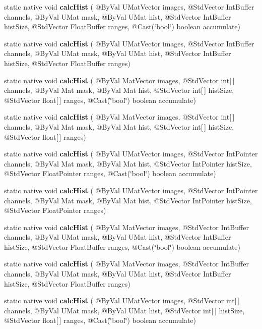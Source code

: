 \begin{DoxyCompactItemize}
\item 
static native void {\bfseries calc\+Hist} ( @By\+Val U\+Mat\+Vector images, @Std\+Vector Int\+Buffer channels, @By\+Val U\+Mat mask, @By\+Val U\+Mat hist, @Std\+Vector Int\+Buffer hist\+Size, @Std\+Vector Float\+Buffer ranges, @Cast(\char`\"{}bool\char`\"{}) boolean accumulate)
\item 
static native void {\bfseries calc\+Hist} ( @By\+Val U\+Mat\+Vector images, @Std\+Vector Int\+Buffer channels, @By\+Val U\+Mat mask, @By\+Val U\+Mat hist, @Std\+Vector Int\+Buffer hist\+Size, @Std\+Vector Float\+Buffer ranges)
\item 
static native void {\bfseries calc\+Hist} ( @By\+Val Mat\+Vector images, @Std\+Vector int\mbox{[}$\,$\mbox{]} channels, @By\+Val Mat mask, @By\+Val Mat hist, @Std\+Vector int\mbox{[}$\,$\mbox{]} hist\+Size, @Std\+Vector float\mbox{[}$\,$\mbox{]} ranges, @Cast(\char`\"{}bool\char`\"{}) boolean accumulate)
\item 
static native void {\bfseries calc\+Hist} ( @By\+Val Mat\+Vector images, @Std\+Vector int\mbox{[}$\,$\mbox{]} channels, @By\+Val Mat mask, @By\+Val Mat hist, @Std\+Vector int\mbox{[}$\,$\mbox{]} hist\+Size, @Std\+Vector float\mbox{[}$\,$\mbox{]} ranges)
\item 
static native void {\bfseries calc\+Hist} ( @By\+Val U\+Mat\+Vector images, @Std\+Vector Int\+Pointer channels, @By\+Val Mat mask, @By\+Val Mat hist, @Std\+Vector Int\+Pointer hist\+Size, @Std\+Vector Float\+Pointer ranges, @Cast(\char`\"{}bool\char`\"{}) boolean accumulate)
\item 
static native void {\bfseries calc\+Hist} ( @By\+Val U\+Mat\+Vector images, @Std\+Vector Int\+Pointer channels, @By\+Val Mat mask, @By\+Val Mat hist, @Std\+Vector Int\+Pointer hist\+Size, @Std\+Vector Float\+Pointer ranges)
\item 
static native void {\bfseries calc\+Hist} ( @By\+Val Mat\+Vector images, @Std\+Vector Int\+Buffer channels, @By\+Val U\+Mat mask, @By\+Val U\+Mat hist, @Std\+Vector Int\+Buffer hist\+Size, @Std\+Vector Float\+Buffer ranges, @Cast(\char`\"{}bool\char`\"{}) boolean accumulate)
\item 
static native void {\bfseries calc\+Hist} ( @By\+Val Mat\+Vector images, @Std\+Vector Int\+Buffer channels, @By\+Val U\+Mat mask, @By\+Val U\+Mat hist, @Std\+Vector Int\+Buffer hist\+Size, @Std\+Vector Float\+Buffer ranges)
\item 
static native void {\bfseries calc\+Hist} ( @By\+Val U\+Mat\+Vector images, @Std\+Vector int\mbox{[}$\,$\mbox{]} channels, @By\+Val U\+Mat mask, @By\+Val U\+Mat hist, @Std\+Vector int\mbox{[}$\,$\mbox{]} hist\+Size, @Std\+Vector float\mbox{[}$\,$\mbox{]} ranges, @Cast(\char`\"{}bool\char`\"{}) boolean accumulate)

\end{DoxyCompactItemize}
